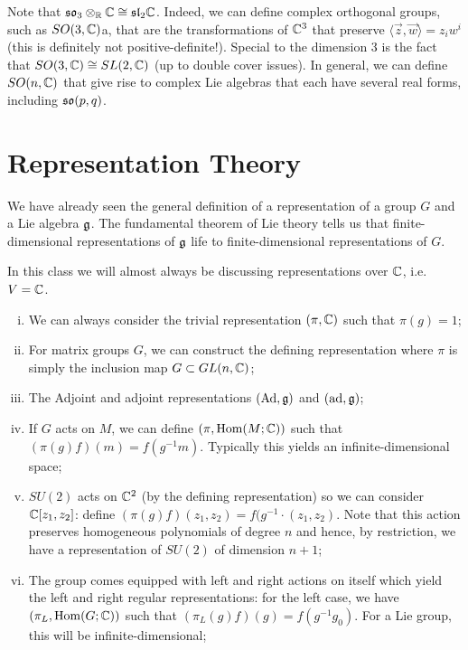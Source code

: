 \documentclass{../mathnotes}
\begin{document}
\begin{exmp}
    Note that $\mathfrak{so}_3\otimes_{\mathbb{R}}\mathbb{C}\cong\mathfrak{sl}_2\mathbb{C}$. Indeed, we can define complex orthogonal groups, such as $SO(3,\mathbb{C})$a, that are the transformations
    of $\mathbb{C}^3$ that preserve $\langle\vec z,\vec w\rangle=z_iw^i$ (this is definitely not positive-definite!). Special to the dimension 3 is the fact that
    $SO(3,\mathbb{C})\cong SL(2,\mathbb{C})$ (up to double cover issues). In general, we can define $SO(n,\mathbb{C})$ that give rise to complex Lie algebras that each have
    several real forms, including $\mathfrak{so}(p,q)$.
\end{exmp}

\section{Representation Theory}

We have already seen the general definition of a representation of a group $G$ and a Lie algebra $\mathfrak g$.
The fundamental theorem of Lie theory tells us that finite-dimensional representations of $\mathfrak g$ life to finite-dimensional
representations of $G$.

\begin{exmp}
    In this class we will almost always be discussing representations over $\mathbb{C}$, i.e. $V=\mathbb{C}$.
    \begin{enumerate}[(i)]
        \item We can always consider the trivial representation $(\pi,\mathbb{C})$ such that $\pi(g)=1$;
        \item For matrix groups $G$, we can construct the defining representation where $\pi$ is simply the inclusion map $G\subset GL(n,\mathbb{C})$;
        \item The Adjoint and adjoint representations $(\text{Ad},\mathfrak g)$ and $(\text{ad},\mathfrak g)$;
        \item If $G$ acts on $M$, we can define $(\pi,\operatorname{Hom}(M;\mathbb{C}))$ such that $(\pi(g)f)(m)=f(g^{-1}m)$. Typically
            this yields an infinite-dimensional space;
        \item $SU(2)$ acts on $\mathbb{C}^2$ (by the defining representation) so we can consider $\mathbb{C}[z_1,z_2]$: define $(\pi(g)f)(z_1,z_2)=f(g^{-1}\cdot(z_1,z_2)$.
            Note that this action preserves homogeneous polynomials of degree $n$ and hence, by restriction, we have a representation of $SU(2)$ of dimension $n+1$;
        \item The group comes equipped with left and right actions on itself which yield the left and right regular representations: for the left case, we have $(\pi_L,\operatorname{Hom}(G;\mathbb{C}))$ such that
            $(\pi_L(g)f)(g)=f(g^{-1}g_0)$. For a Lie group, this will be infinite-dimensional;
    \end{enumerate}
\end{exmp}
\end{document}
